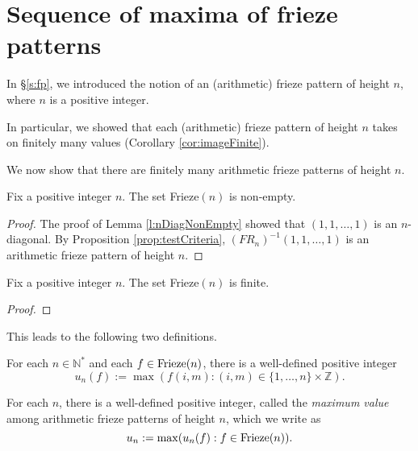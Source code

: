 \chapter{Sequence of maxima of frieze patterns}
In \S \ref{s:fp}, we introduced the notion of an (arithmetic) frieze pattern of height $n$, where $n$ is a positive integer.

In particular, we showed that each (arithmetic) frieze pattern of height $n$ takes on finitely many values (Corollary \ref{cor:imageFinite}). 

We now show that there are finitely many arithmetic frieze patterns of height $n$. 
\begin{lemma}
    \label{l:friezeNonEmpty}
    Fix a positive integer $n$. The set Frieze$(n)$ is non-empty.
\end{lemma}
\begin{proof}
    The proof of Lemma \ref{l:nDiagNonEmpty} showed that $(1,1,\ldots, 1)$ is an $n$-diagonal. 
    By Proposition \ref{prop:testCriteria}, $(FR_n)^{-1}(1,1,\ldots, 1)$ is an arithmetic frieze pattern of 
    height $n$.
\end{proof}
\begin{proposition}
    \label{prop:friezeFinite}
    Fix a positive integer $n$. The set Frieze$(n)$ is finite. 
\end{proposition}
\begin{proof}

\end{proof}

This leads to the following two definitions.
\begin{definition}
    \label{def:unf}
For each $n \in \mathbb{N}^*$ and each $f \in {\rm Frieze}(n)$, there is a well-defined positive integer
\[
    u_n(f) := \max ( f (i,m) : (i,m)  \in \{1,\ldots,n \}\times \mathbb{Z}).
\]
\end{definition}

\begin{definition}
    \label{def:un}
    For each $n$, there is a well-defined
    positive integer, called the {\it maximum value} among arithmetic frieze patterns of height $n$, which we write as
    \[
        u_n := \max (u_n(f) : f \in  {\rm Frieze}(n)).
    \]
\end{definition}





